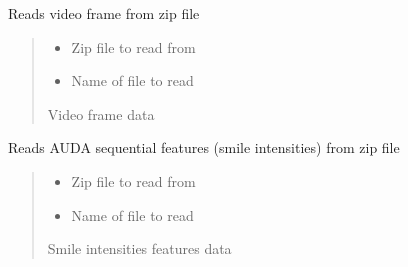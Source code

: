 \documentclass[letterpaper,10pt,english]{sphinxmanual}
\begin{document}

\begin{fulllineitems}
\label{\detokenize{dataset:dataset.read_image}}
\pysigstartsignatures
{}
\pysigstopsignatures
\sphinxAtStartPar
Reads video frame from zip file
\begin{quote}\begin{description}
\begin{itemize}
\item {} 
\sphinxAtStartPar
{} \textendash{} Zip file to read from

\item {} 
\sphinxAtStartPar
{} \textendash{} Name of file to read

\end{itemize}

\sphinxAtStartPar
Video frame data

\end{description}\end{quote}

\end{fulllineitems}


\begin{fulllineitems}
\label{\detokenize{dataset:dataset.read_si_txt}}
\pysigstartsignatures
{}
\pysigstopsignatures
\sphinxAtStartPar
Reads AUDA sequential features (smile intensities) from zip file
\begin{quote}\begin{description}
\begin{itemize}
\item {} 
\sphinxAtStartPar
{} \textendash{} Zip file to read from

\item {} 
\sphinxAtStartPar
{} \textendash{} Name of file to read

\end{itemize}

\sphinxAtStartPar
Smile intensities features data

\end{description}\end{quote}

\end{fulllineitems}
\end{document}
